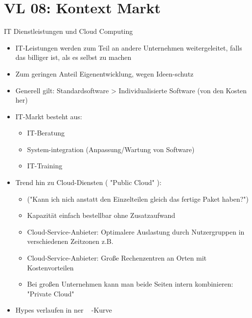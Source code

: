 \section{VL 08: Kontext Markt}
IT Dienstleistungen und Cloud Computing

\begin{itemize}
\item IT-Leistungen werden zum Teil an andere Unternehmen weitergeleitet, falls das billiger ist, als es selbst zu machen
\item Zum geringen Anteil Eigenentwicklung, wegen Ideen-schutz
\item Generell gilt: Standardsoftware > Individualisierte Software (von den Kosten her)
\item IT-Markt besteht aus:
\begin{itemize}
\item IT-Beratung
\item System-integration (Anpassung/Wartung von Software)
\item IT-Training
\end{itemize}
\item Trend hin zu Cloud-Diensten ( "Public Cloud" ): 
\begin{itemize}
\item ("Kann ich nich anstatt den Einzelteilen gleich das fertige Paket haben?")
\item Kapazität einfach bestellbar ohne Zusatzaufwand
\item Cloud-Service-Anbieter: Optimalere Auslastung durch Nutzergruppen in verschiedenen Zeitzonen z.B.
\item Cloud-Service-Anbieter: Große Rechenzentren an Orten mit Kostenvorteilen
\item Bei großen Unternehmen kann man beide Seiten intern kombinieren: "Private Cloud"
\end{itemize}
\item Hypes verlaufen in ner ~ -Kurve

\end{itemize}